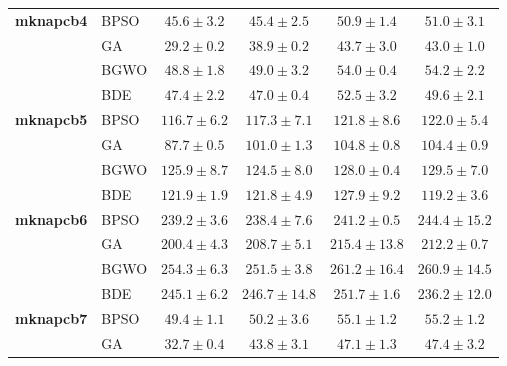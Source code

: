 \begin{table}[htbp]
\begin{tabular*}{\textwidth}{@{\extracolsep{\fill}}llcccc@{}}
    \midrule
    \textbf{mknapcb4}  & BPSO  &           $45.6 \pm 3.2$ &  $\mathbf{45.4 \pm 2.5}$ &           $50.9 \pm 1.4$ &           $51.0 \pm 3.1$ \\
                       & GA    &  $\mathbf{29.2 \pm 0.2}$ &           $38.9 \pm 0.2$ &           $43.7 \pm 3.0$ &           $43.0 \pm 1.0$ \\
                       & BGWO  &  $\mathbf{48.8 \pm 1.8}$ &           $49.0 \pm 3.2$ &           $54.0 \pm 0.4$ &           $54.2 \pm 2.2$ \\
                       & BDE   &           $47.4 \pm 2.2$ &  $\mathbf{47.0 \pm 0.4}$ &           $52.5 \pm 3.2$ &           $49.6 \pm 2.1$ \\
    \midrule
    \textbf{mknapcb5}  & BPSO  & $\mathbf{116.7 \pm 6.2}$ &          $117.3 \pm 7.1$ &          $121.8 \pm 8.6$ &          $122.0 \pm 5.4$ \\
                       & GA    &  $\mathbf{87.7 \pm 0.5}$ &          $101.0 \pm 1.3$ &          $104.8 \pm 0.8$ &          $104.4 \pm 0.9$ \\
                       & BGWO  &          $125.9 \pm 8.7$ & $\mathbf{124.5 \pm 8.0}$ &          $128.0 \pm 0.4$ &          $129.5 \pm 7.0$ \\
                       & BDE   &          $121.9 \pm 1.9$ &          $121.8 \pm 4.9$ &          $127.9 \pm 9.2$ & $\mathbf{119.2 \pm 3.6}$ \\
    \midrule
    \textbf{mknapcb6}  & BPSO  &          $239.2 \pm 3.6$ & $\mathbf{238.4 \pm 7.6}$ &          $241.2 \pm 0.5$ &         $244.4 \pm 15.2$ \\
                       & GA    & $\mathbf{200.4 \pm 4.3}$ &          $208.7 \pm 5.1$ &         $215.4 \pm 13.8$ &          $212.2 \pm 0.7$ \\
                       & BGWO  &          $254.3 \pm 6.3$ & $\mathbf{251.5 \pm 3.8}$ &         $261.2 \pm 16.4$ &         $260.9 \pm 14.5$ \\
                       & BDE   &          $245.1 \pm 6.2$ &         $246.7 \pm 14.8$ &          $251.7 \pm 1.6$ & $\mathbf{236.2 \pm 12.0}$ \\
    \midrule
    \textbf{mknapcb7}  & BPSO  &  $\mathbf{49.4 \pm 1.1}$ &           $50.2 \pm 3.6$ &           $55.1 \pm 1.2$ &           $55.2 \pm 1.2$ \\
                       & GA    &  $\mathbf{32.7 \pm 0.4}$ &           $43.8 \pm 3.1$ &           $47.1 \pm 1.3$ &           $47.4 \pm 3.2$ \\

\end{tabular*}
\end{table}
